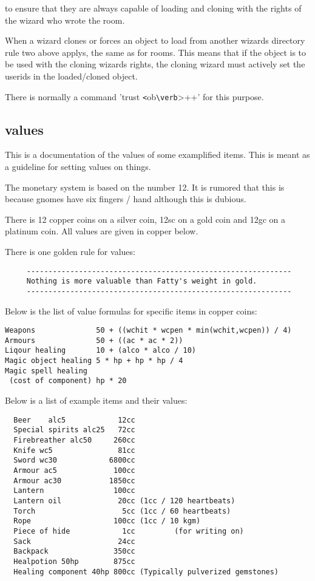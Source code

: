 to ensure that they are always capable of loading and cloning with the rights
of the wizard who wrote the room.

When a wizard clones or forces an object to load from another wizards
directory rule two above applys, the same as for rooms. This means that if
the object is to be used with the cloning wizards rights, the cloning wizard
must actively set the userids in the loaded/cloned object.

There is normally a command 'trust \verb+<+ob\verb+\verb+>++' for this purpose.


\subsection{values}

This is a documentation of the values of some examplified items. This is
meant as a guideline for setting values on things.

The monetary system is based on the number 12. It is rumored that this is
because gnomes have six fingers / hand although this is dubious.

There is 12 copper coins on a silver coin, 12sc on a gold coin and 12gc
on a platinum coin. All values are given in copper below.

There is one golden rule for values:

\begin{verbatim}
     -------------------------------------------------------------
     Nothing is more valuable than Fatty's weight in gold.
     -------------------------------------------------------------  
\end{verbatim}

Below is the list of value formulas for specific items in copper coins:

\begin{verbatim}
Weapons              50 + ((wchit * wcpen * min(wchit,wcpen)) / 4)
Armours              50 + ((ac * ac * 2))
Liqour healing       10 + (alco * alco / 10)
Magic object healing 5 * hp + hp * hp / 4
Magic spell healing
 (cost of component) hp * 20 
\end{verbatim}

Below is a list of example items and their values:

\begin{verbatim}
  Beer    alc5            12cc
  Special spirits alc25   72cc
  Firebreather alc50     260cc
  Knife wc5               81cc
  Sword wc30            6800cc  
  Armour ac5             100cc
  Armour ac30           1850cc  
  Lantern                100cc 
  Lantern oil             20cc (1cc / 120 heartbeats)
  Torch                    5cc (1cc / 60 heartbeats)
  Rope                   100cc (1cc / 10 kgm)
  Piece of hide            1cc         (for writing on)
  Sack                    24cc 
  Backpack               350cc  
  Healpotion 50hp        875cc
  Healing component 40hp 800cc (Typically pulverized gemstones)
\end{verbatim}  


